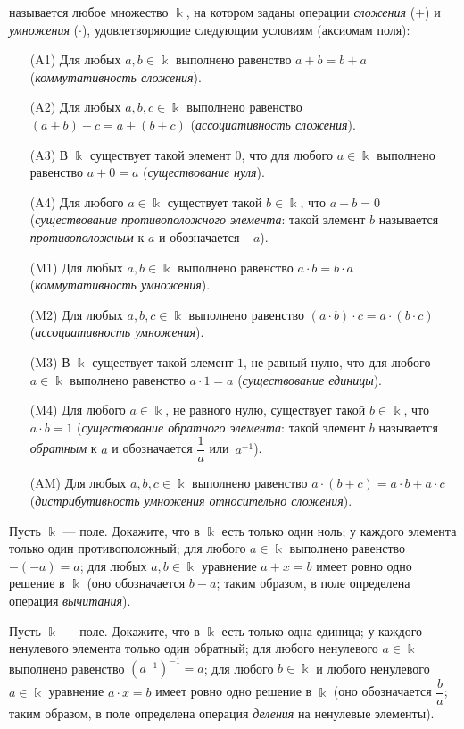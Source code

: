 \documentclass[a4paper,11pt]{article}
\begin{document}

 называется любое множество $\Bbbk$, на котором заданы операции
\emph{сложения} ($+$) и \emph{умножения} ($\cdot$),
удовлетворяющие следующим условиям (аксиомам поля):
\begin{itemize}
\item[(A1)]
Для любых $a,b\in\Bbbk$ выполнено равенство $a+b=b+a$
(\emph{коммутативность сложения}).
\item[(A2)]
Для любых $a,b,c\in\Bbbk$ выполнено равенство $(a+b)+c=a+(b+c)$
(\emph{ассоциативность сложения}).
\item[(A3)]
В $\Bbbk$ существует такой элемент $0$, что для любого $a\in\Bbbk$
выполнено равенство
$a+0=a$ (\emph{существование нуля}).
\item[(A4)]
Для любого $a\in\Bbbk$ существует такой $b\in\Bbbk$, что $a+b=0$
(\emph{существование противоположного элемента}: такой элемент $b$
называется \emph{противоположным} к $a$ и обозначается $-a$).
\item[(M1)]
Для любых $a,b\in\Bbbk$ выполнено равенство $a\cdot b=b\cdot a$
(\emph{коммутативность умножения}).
\item[(M2)]
Для любых $a,b,c\in\Bbbk$ выполнено равенство $(a\cdot b)\cdot
c=a\cdot (b\cdot c)$ (\emph{ассоциативность умножения}).
\item[(M3)]
В $\Bbbk$ существует такой элемент $1$, не равный нулю, что для
любого $a\in\Bbbk$ выполнено равенство $a\cdot 1=a$
(\emph{существование единицы}).
\item[(M4)]
Для любого $a\in\Bbbk$, не равного нулю, существует такой
$b\in\Bbbk$, что $a\cdot b=1$ (\emph{существование обратного
элемента}: такой элемент $b$ называется \emph{обратным} к $a$ и
обозначается $\dfrac1a$ или~$a^{-1}$).
\item[(AM)]
Для любых $a,b,c\in\Bbbk$ выполнено равенство $a\cdot(b+c)=a\cdot
b + a\cdot c$ (\emph{дистрибутивность умножения относительно
сложения}).
\end{itemize}


Пусть $\Bbbk$ --- поле. Докажите, что
в $\Bbbk$ есть только один ноль;
у каждого элемента только один противоположный;
для любого $a\in\Bbbk$ выполнено равенство
$-(-a)=a$;
для любых $a,b\in\Bbbk$ уравнение $a+x=b$ имеет ровно одно решение
в $\Bbbk$ (оно обозначается $b-a$; таким образом, в поле
определена операция \emph{вычитания}).


Пусть $\Bbbk$ --- поле. Докажите, что
в $\Bbbk$ есть только одна единица;
у каждого ненулевого элемента только один обратный;
для любого ненулевого $a\in\Bbbk$ выполнено равенство
$(a^{-1})^{-1}=a$;
для любого $b\in\Bbbk$ и любого ненулевого $a\in\Bbbk$ уравнение
$a\cdot x=b$ имеет ровно одно решение в $\Bbbk$ (оно обозначается
$\dfrac b a$; таким образом, в поле определена операция
\emph{деления} на ненулевые элементы).
\end{document}
